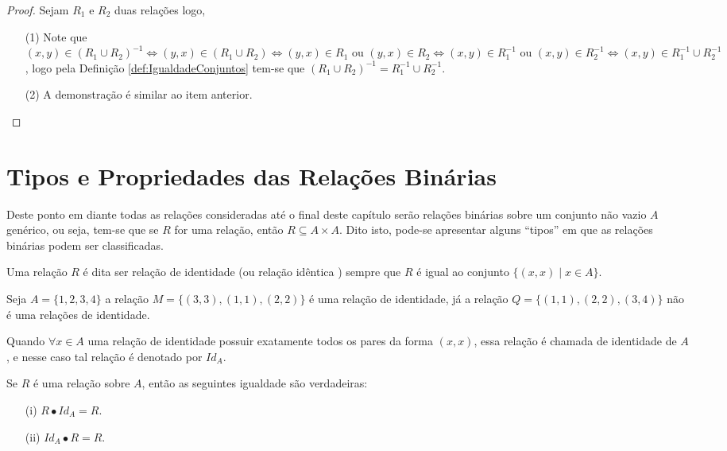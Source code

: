 \begin{proof}
	Sejam $R_1$ e $R_2$ duas relações logo,
	\begin{itemize}
		\item[(1)] Note que $(x, y) \in (R_1 \cup R_2)^{-1} \Longleftrightarrow  (y, x) \in (R_1 \cup R_2) \Longleftrightarrow (y, x) \in R_1 \text{ ou } (y, x) \in R_2 \Longleftrightarrow (x, y) \in R_1^{-1} \text{ ou } (x, y) \in R_2^{-1} \Longleftrightarrow (x, y) \in R_1^{-1} \cup R_2^{-1}$, logo pela Definição \ref{def:IgualdadeConjuntos} tem-se que $(R_1 \cup R_2)^{-1} = R_1^{-1} \cup R_2^{-1}$.
		\item[(2)] A demonstração é similar ao item anterior.
	\end{itemize}
\end{proof}

\section{Tipos e Propriedades das Relações Binárias}\label{sec:TipoDasRelacoesBinarias}

Deste ponto em diante todas as relações consideradas até o final deste capítulo serão relações binárias sobre um conjunto não vazio $A$ genérico, ou seja, tem-se que se $R$ for uma relação, então $R \subseteq A \times A$. Dito isto, pode-se apresentar alguns ``tipos'' em que as relações binárias podem ser classificadas.

\begin{definition}\label{def:RelacaoIdentica}
	Uma relação $R$ é dita ser relação de identidade (ou relação idêntica \cite{abe1991-TC}) sempre que $R$ é igual ao conjunto $\{(x, x) \mid x \in A\}$.
\end{definition}

\begin{example}
	Seja $A = \{1, 2, 3, 4\}$ a relação $M = \{(3, 3), (1, 1), (2,2)\}$ é uma relação de identidade, já a relação $Q = \{(1, 1), (2,2), (3,4)\}$ não é uma relações de identidade.
\end{example}

\begin{remark}
	Quando $\forall x \in A$ uma relação de identidade possuir exatamente todos os pares da forma $(x, x)$, essa relação é chamada de identidade de $A$, e nesse caso tal relação é denotado por $Id_A$.
\end{remark}

\begin{theorem}\label{teo:NeutralidadeRelacaoIdentidade}
	Se $R$ é uma relação sobre $A$, então as seguintes igualdade são verdadeiras:
	\begin{itemize}
		\item[(i)] $R \bullet Id_A = R$.
		\item[(ii)] $Id_A \bullet R = R$.
	\end{itemize}
\end{theorem}

